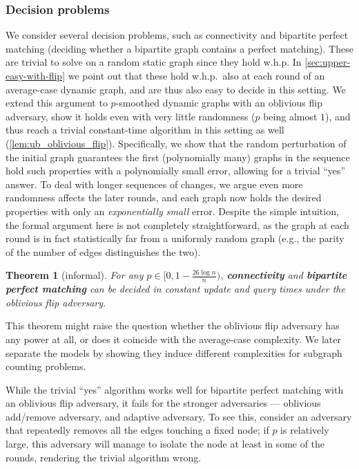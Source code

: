 \documentclass[letter,11pt]{article}
\newtheorem{atheorem}{Theorem}[section]
\begin{document}
\subsubsection{Decision problems}
We consider several decision problems, such as
connectivity and bipartite perfect matching (deciding whether a bipartite graph contains a perfect matching).
These are trivial to solve on a random static graph
since they hold w.h.p.
In \cref{sec:upper-easy-with-flip} we point out that these hold w.h.p.\ also at each round of an average-case dynamic graph, and are thus also easy to decide in this setting.
We extend this argument to $p$-smoothed dynamic graphs with an oblivious flip adversary, 
show it holds even with very little randomness ($p$ being almost $1$),
and thus reach a trivial constant-time algorithm in this setting as well (\cref{lem:ub_oblivious_flip}).
Specifically, we show that the random perturbation of the initial graph  guarantees the first (polynomially many) graphs in the sequence hold such properties with a polynomially small error, allowing for a trivial ``yes'' answer.
To deal with longer sequences of changes, we argue even more randomness affects the later rounds, and each graph now holds the desired properties with only an \emph{exponentially small} error.
Despite the simple intuition, the formal argument here is not completely straightforward, as the graph at each round is in fact statistically far from a uniformly random graph (e.g.,  the parity of the number of edges distinguishes the two).


\begin{atheorem}[informal]
	\label{athm:decision problems-alg}
    For any $p\in[0,1-\frac{26\log n}{n})$, \textbf{connectivity} and \textbf{bipartite perfect matching} can be decided in constant update and query times under the oblivious flip adversary.
\end{atheorem}

This theorem might raise the question whether the oblivious flip adversary has any power at all, or does it coincide with the average-case complexity.
We later separate the models by showing they induce different complexities for subgraph counting problems.

While the trivial ``yes'' algorithm works well for  bipartite perfect matching with an oblivious flip adversary,
it fails for the stronger adversaries --- oblivious add/remove adversary, and adaptive adversary.
To see this, consider an adversary that repeatedly removes all the edges touching a fixed node;
if $p$ is relatively large, this adversary will manage to isolate the node at least in some of the rounds, rendering the trivial algorithm wrong.
\end{document}
